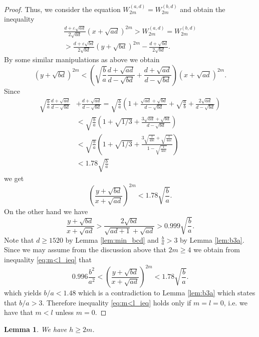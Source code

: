 \documentclass{amsart}
\newtheorem{lemma}{Lemma}
\theoremstyle{definition}
\begin{document}
\begin{proof}
Thus, we consider the equation $W^{(a,d)}_{2m} = W^{(b,d)}_{2m}$ and obtain
the inequality 
\begin{multline*}
\frac{d+\varepsilon\sqrt{ad}}{2\sqrt{ad}}\left(x+\sqrt{ad}\right)^{2m}>W^{(a,d)}_{2m} = W^{(b,d)}_{2m}\\
> \frac{d+\varepsilon\sqrt{bd}}{2\sqrt{bd}}\left(y+\sqrt{bd}\right)^{2m}-\frac{d+\sqrt{bd}}{2\sqrt{bd}}.
\end{multline*}
By some similar manipulations as above we obtain
$$
 \left(y+\sqrt{bd}\right)^{2m}<\left(\sqrt{\frac ba}\frac{d+\sqrt{ad}}{d-\sqrt{bd}}+\frac{d+\sqrt{ad}}{d-\sqrt{bd}}\right)(x+\sqrt{ad})^{2m}.
$$
Since
\begin{align*}
\sqrt{\frac ba}\frac{d+\sqrt{ad}}{d-\sqrt{bd}}&+\frac{d+\sqrt{ad}}{d-\sqrt{bd}}=\sqrt{\frac ba}\left( 1+\frac{\sqrt{ad}+\sqrt{bd}}{d-\sqrt{bd}}+\sqrt{\frac ab}+\frac{2\sqrt{ad}}{d-\sqrt{bd}}\right)\\
&<\sqrt{\frac ba}\left(1+\sqrt{1/3}+\frac{3\sqrt{ad}+\sqrt{bd}}{d-\sqrt{bd}}\right)\\
&<\sqrt{\frac ba}\left(1+\sqrt{1/3}+\frac{3\sqrt{\frac{1}{4bc}}+\sqrt{\frac{1}{4ac}}}{1-\sqrt{\frac{1}{4ac}}}\right)\\
&<1.78 \sqrt{\frac ba}
\end{align*}
we get
\begin{equation}\label{eq:m<l_ieq}
\left(\frac{y+\sqrt{bd}}{x+\sqrt{ad}}\right)^{2m}<1.78 \sqrt{\frac ba}.
\end{equation}
On the other hand we have 
$$
\frac{y+\sqrt{bd}}{x+\sqrt{ad}}>\frac{2\sqrt{bd}}{\sqrt{ad+1}+\sqrt{ad}}>0.999\sqrt{\frac ba}.
$$
Note that $d\geq 1520$ by Lemma \ref{lem:min_bcd} and $\frac ba>3$ by Lemma \ref{lem:b3a}. Since we may assume from the discussion above that $2m\geq 4$ we obtain from inequality \eqref{eq:m<l_ieq}
that
$$
0.996\frac {b^2}{a^2}<\left(\frac{y+\sqrt{bd}}{x+\sqrt{ad}}\right)^{2m}<1.78 \sqrt{\frac ba}.
$$
which yields $b/a<1.48$ which is a contradiction to Lemma \ref{lem:b3a} which states that $b/a>3$.
Therefore inequality \eqref{eq:m<l_ieq} holds only if $m=l=0$, i.e. we have that $m<l$ unless $m=0$.
\end{proof}

\begin{lemma}\label{lem:hm}
We have $h\ge 2m$.
\end{lemma}
\end{document}
